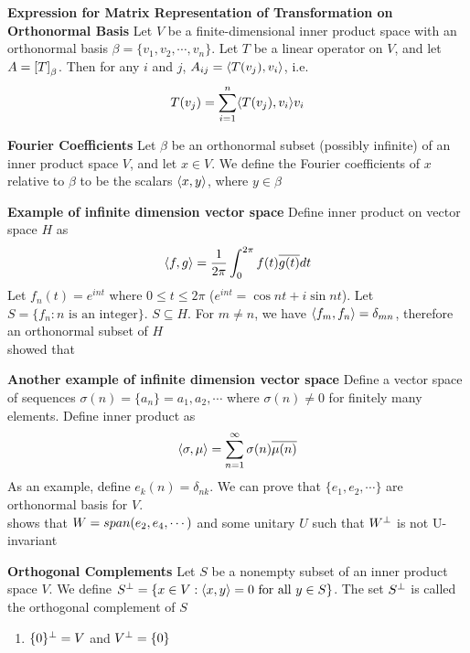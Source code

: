 \documentclass[11pt]{article}
\begin{document}
\begin{corollary*}
    \textbf{Expression for Matrix Representation of Transformation on Orthonormal Basis} Let $V$ be a finite-dimensional inner product space with an orthonormal basis $\beta = \{v_1,v_2,\cdots, v_n\}$. Let $T$ be a linear operator on $V$, and let $A = \left[ T \right]_{\beta}$. Then for any $i$ and $j$, $A_{ij} = \langle T(v_j),v_i\rangle$, i.e. 
    \[
        T(v_j) = \sum_{i=1}^n \langle T(v_j),v_i\rangle  v_i  
    \]
\end{corollary*}


\begin{defn*}
    \textbf{Fourier Coefficients} Let $\beta$ be an orthonormal subset (possibly infinite) of an inner product space $V$, and let $x\in V$. We define the Fourier coefficients of $x$ relative to $\beta$ to be the scalars $\langle x,y\rangle$, where $y\in \beta$
\end{defn*}

\begin{defn*}
    \textbf{Example of infinite dimension vector space } Define inner product on vector space $H$ as
    \[
        \langle f,g\rangle = \frac{1}{2\pi}\int_{0}^{2\pi} f(t) \overline{g(t)} dt
    \]
    Let $f_n(t) = e^{int}$ where $0\leq t \leq 2\pi$ ($e^{int} = \cos nt + i\sin nt$). Let $S = \{ f_n : n \text{ is an integer} \}$. $S\subseteq H$. For $m\neq n$, we have $\langle f_m,f_n\rangle = \delta_{mn}$, therefore an orthonormal subset of $H$ \\
     showed that 
\end{defn*}

\begin{defn*}
    \textbf{Another example of infinite dimension vector space}  Define a vector space of sequences $\sigma(n) = \{ a_n\} = a_1, a_2,\cdots$ where $\sigma(n) \neq 0$ for finitely many elements. Define inner product as 
    \[
        \langle\sigma,\mu\rangle = \sum_{n=1}^{\infty} \sigma(n) \overline{\mu(n)}
    \]
     As an example, define $e_k(n) = \delta_{nk}$. We can prove that $\{e_1, e_2, \cdots \}$ are orthonormal basis for $V$. \\
     shows that $W = span(e_2, e_4, \cdots)$ and some unitary $U$ such that $W^{\perp}$ is not U-invariant
\end{defn*}



\begin{defn*}
    \textbf{Orthogonal Complements} Let $S$  be a nonempty subset of an inner product space $V$. We define $S^{\perp} = \{x\in V: \langle x,y\rangle = 0 \text{ for all } y\in S \}$. The set $S^{\perp}$ is called the orthogonal complement of $S$
    \begin{enumerate}
        \item $\{0\}^{\perp} = V$ and $V^{\perp} = \{0\}$ 
    \end{enumerate}
\end{defn*}
\end{document}
